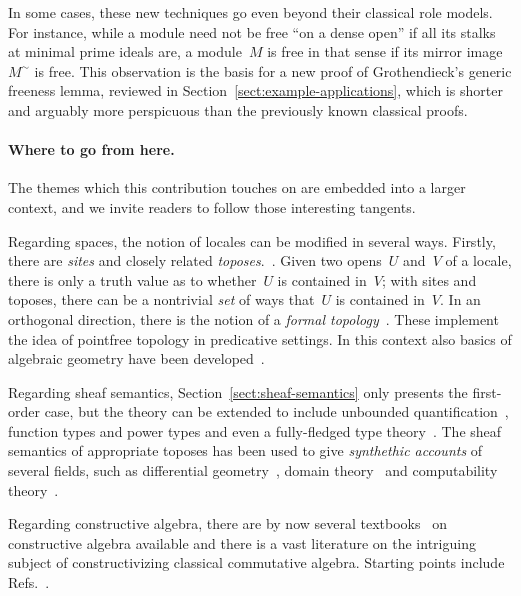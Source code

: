 \documentclass{ws-rv9x6}
\begin{document}
{In some cases, these new techniques go even beyond their classical role models.
For instance, while a module need not be free ``on a dense open'' if all its
stalks at minimal prime ideals are, a module~$M$ is free in that sense if its
mirror image~$M^\sim$ is \notnot free. This observation is the basis for a
new proof of Grothendieck's generic freeness lemma, reviewed in
Section~\ref{sect:example-applications}, which is shorter and arguably more
perspicuous than the previously known classical proofs.


\paragraph{Where to go from here.} The themes which this contribution touches
on are embedded into a larger context, and we invite readers to follow those
interesting tangents.

Regarding spaces, the notion of locales can be modified in several ways.
Firstly, there are \emph{sites} and closely related
\emph{toposes}.~\cite{leinster:introduction,moerdijk-maclane:sheaves-logic}.
Given two opens~$U$ and~$V$ of a locale, there is only a truth value as to
whether~$U$ is contained in~$V$; with sites and toposes, there can be a
nontrivial \emph{set} of ways that~$U$ is contained in~$V$. In an orthogonal
direction, there is the notion of a \emph{formal
topology}~\cite{sambin:some-points,sambin:ifs}. These implement the idea of
pointfree topology in predicative settings. In this context also basics of
algebraic geometry have been
developed~\cite{schuster:formal-zariski,cls:spectral-schemes,cls:projective-spectrum}.

Regarding sheaf semantics, Section~\ref{sect:sheaf-semantics} only presents
the first-order case, but the theory can be extended to include unbounded
quantification~\cite{shulman:stack-semantics}, function types and power types
and even a fully-fledged type theory~\cite{maietti:modular-correspondence}. The
sheaf semantics of appropriate toposes has been used to give \emph{synthethic
accounts} of several fields, such as differential geometry~\cite{kock:sdg},
domain theory~\cite{hyland:synthetic-domain-theory} and computability
theory~\cite{bauer:synthetic-computability-theory}.

Regarding constructive algebra, there are by now several
textbooks~\cite{mines-richman-ruitenburg:constructive-algebra,lombardi-quitte:constructive-algebra,yengui:constructive-commutative-algebra}
on constructive algebra available and there is a vast literature on
the intriguing subject of constructivizing classical commutative algebra.
Starting points include
Refs.~.


}
\end{document}

